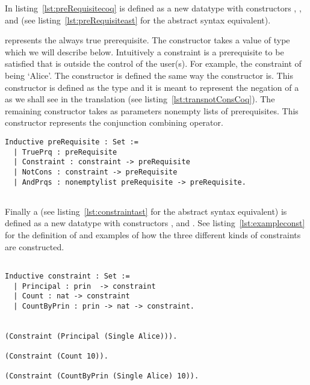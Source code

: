 In listing~\ref{lst:preRequisitecoq}  is defined as a new datatype with constructors , ,  and  (see listing~\ref{lst:preRequisiteast} for the abstract syntax equivalent).

 represents the always true prerequisite. The  constructor takes a value of type  which we will describe below. Intuitively a constraint is a prerequisite to be satisfied that is outside the control of the user(s). For example, the constraint of being `Alice'. The constructor  is defined the same way the  constructor is. This constructor is defined as the type  and it is meant to represent the negation of a  as we shall see in the translation (see listing~\ref{lst:transnotConsCoq}). The remaining constructor  takes as parameters nonempty lists of prerequisites. This constructor represents the conjunction combining operator. 


\lstset{language=Coq}
\begin{lstlisting}[frame=single, caption={preRequisite},label={lst:preRequisitecoq}]
Inductive preRequisite : Set :=
  | TruePrq : preRequisite
  | Constraint : constraint -> preRequisite 
  | NotCons : constraint -> preRequisite 
  | AndPrqs : nonemptylist preRequisite -> preRequisite.
  
\end{lstlisting}

Finally a  (see  listing~\ref{lst:constraintast} for the abstract syntax equivalent) is defined as a new datatype with constructors ,  and . See listing~\ref{lst:exampleconst} for the definition of  and examples of how the three different kinds of constraints are constructed.

\lstset{language=Coq}
\begin{minipage}[c]{0.95\textwidth}
\begin{lstlisting}[frame=single, caption={Constraint Definition and the Three Kinds of Constraints},label={lst:exampleconst}]

Inductive constraint : Set :=
  | Principal : prin  -> constraint 
  | Count : nat -> constraint 
  | CountByPrin : prin -> nat -> constraint.


(Constraint (Principal (Single Alice))).

(Constraint (Count 10)).

(Constraint (CountByPrin (Single Alice) 10)).

\end{lstlisting}
\end{minipage}


